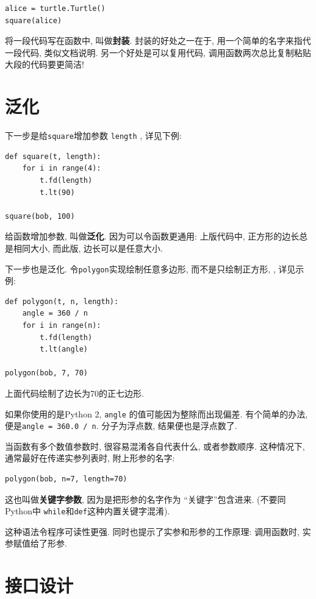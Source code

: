 \documentclass[10pt]{book}
\begin{document}
\begin{verbatim}
alice = turtle.Turtle()
square(alice)
\end{verbatim}
%
将一段代码写在函数中, 叫做{\bf 封装}. 
封装的好处之一在于, 用一个简单的名字来指代一段代码, 类似文档说明. 
另一个好处是可以复用代码, 调用函数两次总比复制粘贴大段的代码要更简洁!


\section{泛化}

下一步是给{\tt square}增加参数 {\tt length} , 详见下例:

\begin{verbatim}
def square(t, length):
    for i in range(4):
        t.fd(length)
        t.lt(90)

square(bob, 100)
\end{verbatim}
%
给函数增加参数, 叫做{\bf 泛化}. 
因为可以令函数更通用:
上版代码中, 正方形的边长总是相同大小, 
而此版, 边长可以是任意大小.

下一步也是泛化. 令{\tt polygon}实现绘制任意多边形, 
而不是只绘制正方形, , 详见示例:

\begin{verbatim}
def polygon(t, n, length):
    angle = 360 / n
    for i in range(n):
        t.fd(length)
        t.lt(angle)

polygon(bob, 7, 70)
\end{verbatim}
%
上面代码绘制了边长为70的正七边形. 

如果你使用的是Python 2, {\tt angle} 的值可能因为整除而出现偏差. 
有个简单的办法, 便是{\tt angle = 360.0 / n}. 分子为浮点数, 结果便也是浮点数了. 

当函数有多个数值参数时, 很容易混淆各自代表什么, 或者参数顺序. 
这种情况下, 通常最好在传递实参列表时, 附上形参的名字:

\begin{verbatim}
polygon(bob, n=7, length=70)
\end{verbatim}
%
这也叫做{\bf 关键字参数}, 因为是把形参的名字作为 ``关键字''包含进来. 
(不要同Python中 {\tt while}和{\tt def}这种内置关键字混淆). 

这种语法令程序可读性更强. 同时也提示了实参和形参的工作原理:
调用函数时, 实参赋值给了形参. 


\section{接口设计}
\end{document}
